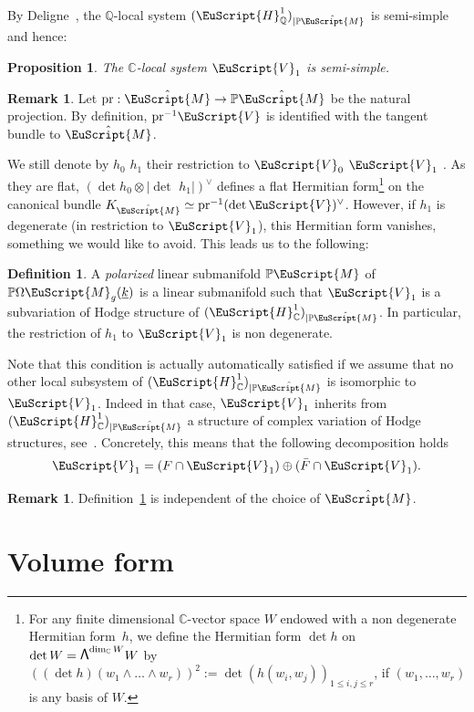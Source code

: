 \documentclass[JEP,XML,SOM,Unicode]{cedram}
\let\mathcal\EuScript
\newcommand\bw{{\hbox{\large$\mathsf{\Lambda}$}}}
\theoremstyle{plain}
\newtheorem{Proposition}[Theorem]{Proposition}
\theoremstyle{definition}
\newtheorem{Definition}[Theorem]{Definition}
\newtheorem{Remark}[Theorem]{Remark}
\def\C{\mathbb{C}}
\newcommand{\Q}{\mathbb{Q}}
\newcommand{\Pb}{\mathbb{P}}
\newcommand{\Mcal}{\mathcal{M}}
\newcommand{\cH}{\mathcal{H}}
\newcommand{\cM}{\mathcal{M}}
\newcommand{\cV}{\mathcal{V}}
\newcommand{\pr}{\mathrm{pr}}
\let\ul\underline
\newcommand{\trate}{\Omega\Mcal_{g}(\ul{k})}
\begin{document}
By Deligne~\cite{Deligne:TH2}, the $\Q$-local system $(\cH^1_{\Q})_{|\Pb\hat\cM}$ is semi-simple and hence:
\begin{Proposition}
The $\C$-local system $\cV_1$ is semi-simple.
\end{Proposition}

\begin{Remark}\label{rk:loc:syst:tangent:bdl}
Let $\pr: \hat{\cM} \to \Pb\hat{\cM}$ be the natural projection. By definition, ${\pr}^{-1}\cV$ is identified with the tangent bundle to $\hat\cM$.
\end{Remark}

We still denote by $h_0$ \resp $h_1$ their restriction to $\cV_0$ \resp $\cV_1$ . As they are flat, $(\det h_0 \otimes |{\det\,}\, h_1|)^\vee$ defines a flat Hermitian form\footnote{For any finite dimensional $\C$-vector space $W$ endowed with a non degenerate Hermitian form~$h$, we define the Hermitian form $\det h$ on $\det W=\bw^{\dim_\C W} W$ by $((\det h)(w_1\wedge\dots\wedge w_r))^2:=\det (h(w_i,w_j))_{1\leq i,j\leq r}$, if $(w_1,\dots,w_r)$ is any basis of $W$.}
on the canonical bundle $K_{\hat\cM}\simeq\pr^{-1}(\det \cV)^\vee$.
However, if $h_1$ is degenerate (in restriction to $\cV_1$), this Hermitian form vanishes, something we would like to avoid. This leads us to the following:

\begin{Definition}\label{def:polarized}
A \emph{polarized} linear submanifold $\Pb\cM$ of $\Pb\trate$ is a linear submanifold such that $\cV_1$ is a subvariation of Hodge structure of $(\cH^1_\C)_{|\Pb\hat\cM}$. In particular, the restriction of $h_1$ to $\cV_1$ is non degenerate.
\end{Definition}

Note that this condition is actually automatically satisfied if we assume that no other local subsystem of $(\cH^1_{\C})_{|\Pb\hat\cM}$ is isomorphic to $\cV_1$. Indeed in that case, $\cV_1$ inherits from $(\cH^1_{\C})_{|\Pb\hat\cM}$ a structure of complex variation of Hodge structures, see~\cite[-13]{Deligne:TFM}.
Concretely, this means that the following decomposition holds
\[\cV_1 = (F \cap \cV_1) \oplus (\bar F \cap \cV_1).\]

\begin{Remark}\label{rk:choice:of:cover}
Definition~\ref{def:polarized} is independent of the choice of $\hat\cM$.
\end{Remark}

\section{Volume form}\label{sec:volform}
\end{document}
